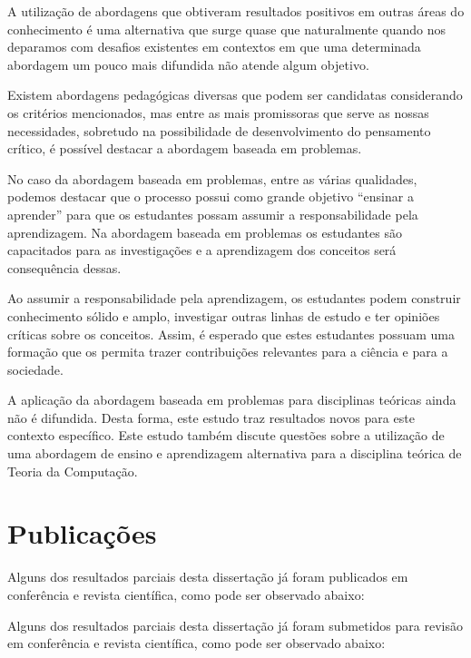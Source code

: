 A utilização de abordagens que obtiveram
resultados positivos em outras áreas do conhecimento é uma
alternativa que surge quase que naturalmente quando
nos deparamos com desafios existentes em contextos
em que uma determinada abordagem um pouco mais difundida
não atende algum objetivo.

Existem abordagens pedagógicas diversas que podem
ser candidatas considerando os critérios mencionados,
mas entre as mais promissoras que serve
as nossas necessidades, sobretudo na possibilidade
de desenvolvimento do pensamento crítico, é possível
destacar a abordagem baseada em problemas.

No caso da abordagem baseada em problemas, entre as
várias qualidades, podemos destacar que o processo
possui como grande objetivo ``ensinar a aprender'' para
que os estudantes possam assumir a
responsabilidade pela aprendizagem.
Na abordagem baseada em problemas os estudantes
são capacitados para as investigações e a aprendizagem
dos conceitos será consequência dessas.

Ao assumir a responsabilidade pela aprendizagem, os
estudantes podem construir conhecimento sólido
e amplo, investigar outras linhas de estudo e ter opiniões
críticas sobre os conceitos.
Assim, é esperado que estes estudantes possuam uma
formação que os permita trazer contribuições
relevantes para a ciência e para a sociedade.

A aplicação da abordagem baseada em problemas
para disciplinas teóricas ainda não é difundida.
Desta forma, este estudo traz resultados novos para
este contexto específico.
Este estudo também discute questões sobre a utilização
de uma abordagem de ensino e aprendizagem alternativa
para a disciplina teórica de Teoria da Computação.

\section{Publicações}
\label{sec-publicacoes}
Alguns dos resultados parciais desta dissertação já
foram publicados em conferência e revista científica,
como pode ser observado abaixo:
\begin{itemize}

\end{itemize}

Alguns dos resultados parciais desta dissertação já
foram submetidos para revisão em conferência e revista
científica, como pode ser observado abaixo:
\begin{itemize}

\end{itemize}

